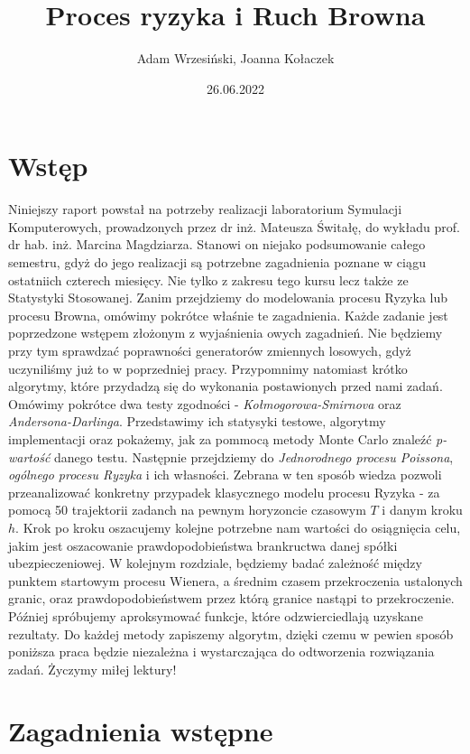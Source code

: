 \documentclass{article}
\title{Proces ryzyka i Ruch Browna}
\author{Adam Wrzesiński, Joanna Kołaczek}
\date{26.06.2022}
\theoremstyle{break}
\numberwithin{equation}{subsection}
\numberwithin{figure}{section}
\begin{document}
\maketitle
\tableofcontents
\newpage
\section*{Wstęp}

Niniejszy raport powstał na potrzeby realizacji laboratorium Symulacji Komputerowych, prowadzonych przez dr inż. Mateusza Świtałę, do wykładu prof. dr hab. inż. Marcina Magdziarza. Stanowi on niejako podsumowanie całego semestru, gdyż do jego realizacji są potrzebne zagadnienia poznane w ciągu ostatniich czterech miesięcy. Nie tylko z zakresu tego kursu
lecz także ze Statystyki Stosowanej. Zanim przejdziemy do modelowania procesu Ryzyka lub procesu Browna, omówimy pokrótce właśnie te zagadnienia. Każde zadanie jest poprzedzone wstępem złożonym z wyjaśnienia owych zagadnień. Nie będziemy przy tym sprawdzać poprawności generatorów zmiennych losowych, gdyż uczyniliśmy już to w poprzedniej pracy.
Przypomnimy natomiast krótko algorytmy, które przydadzą się do wykonania postawionych przed nami zadań. Omówimy pokrótce dwa testy zgodności - \emph{Kołmogorowa-Smirnova} oraz \emph{Andersona-Darlinga}. Przedstawimy ich statysyki testowe, algorytmy implementacji oraz pokażemy, jak za pommocą metody Monte Carlo znaleźć \emph{p-wartość} danego testu.
Następnie przejdziemy do \emph{Jednorodnego procesu Poissona}, \emph{ogólnego procesu Ryzyka} i ich własności. Zebrana w ten sposób wiedza pozwoli przeanalizować konkretny przypadek klasycznego modelu procesu Ryzyka - za pomocą 50 trajektorii zadanch na pewnym horyzoncie czasowym $T$  i danym kroku $h$. Krok po kroku oszacujemy kolejne potrzebne nam wartości do osiągnięcia celu, jakim jest oszacowanie prawdopodobieństwa brankructwa danej spółki ubezpieczeniowej. W kolejnym rozdziale, będziemy badać zależność między punktem startowym procesu Wienera, a średnim czasem przekroczenia ustalonych granic, oraz prawdopodobieństwem przez którą granice nastąpi to przekroczenie. Później spróbujemy aproksymować funkcje, które odzwierciedlają uzyskane rezultaty. Do każdej metody zapiszemy algorytm, dzięki czemu w pewien sposób poniższa praca będzie niezależna i wystarczająca do odtworzenia rozwiązania zadań. Życzymy miłej lektury!

\newpage

\section{Zagadnienia wstępne}
\end{document}
